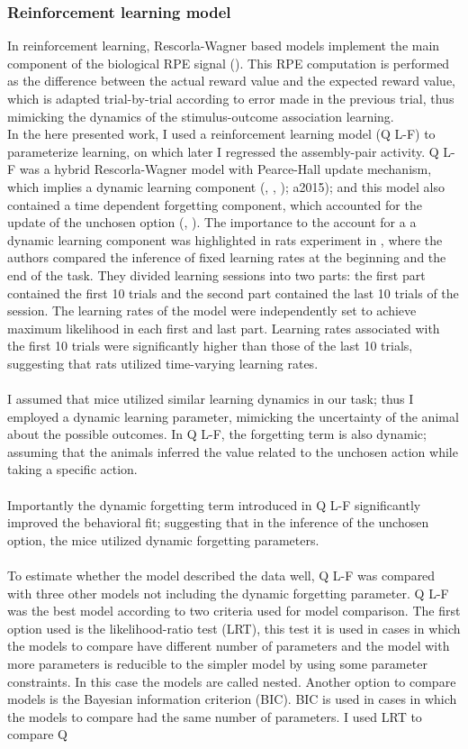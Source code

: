 \subsubsection{Reinforcement learning model}
In reinforcement learning, Rescorla-Wagner based models implement the main component of the biological RPE signal (\cite{Schultz2016}). This RPE computation is performed as the difference between the actual reward value and the expected reward value, which is adapted trial-by-trial according to error made in the previous trial, thus mimicking the dynamics of the stimulus-outcome association learning.\\In the here presented work, I used a reinforcement learning model (Q L-F) to parameterize learning, on which later I regressed the assembly-pair activity. Q L-F was a hybrid Rescorla-Wagner model with Pearce-Hall update mechanism, which implies a dynamic learning component (\cite{Koppe}, \cite{Li}, \cite{Costa}); a2015); and this model also contained a time dependent forgetting component, which accounted for the update of the unchosen option (\cite{ItoDoya1}, \cite{Katahira}). The importance to the account for a a dynamic learning component was highlighted in rats experiment in  , where the authors compared the inference of fixed learning rates at the beginning and the end of the task. They divided learning sessions into two parts: the first part contained the first 10 trials and the second part contained the last 10 trials of the session. The learning rates of the model were independently set to achieve maximum likelihood in each first and last part. Learning rates associated with the first 10 trials were significantly higher than those of the last 10 trials, suggesting that rats utilized time-varying learning rates.\\\\I assumed that mice utilized similar learning dynamics in our task; thus I employed a dynamic learning parameter, mimicking the uncertainty of the animal about the possible outcomes. In Q L-F, the forgetting term is also dynamic; assuming that the animals inferred the value related to the unchosen action while taking a specific action.\\\\Importantly the dynamic forgetting term introduced in Q L-F significantly improved the behavioral fit; suggesting that in the inference of the unchosen option, the mice utilized dynamic forgetting parameters.\\\\To estimate whether the model described the data well, Q L-F was compared with three other models not including the dynamic forgetting parameter. Q L-F was the best model according to two criteria used for model comparison. The first option used is the likelihood-ratio test (LRT), this test it is used in cases in which the models to compare have different number of parameters and the model with more parameters is reducible to the simpler model by using some parameter constraints. In this case the models are called nested. Another option to compare models is the Bayesian information criterion (BIC). BIC is used in cases in which the models to compare had the same number of parameters. I used LRT to compare Q 